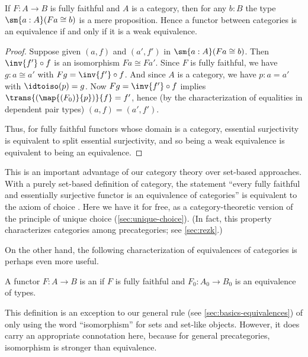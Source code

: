 \begin{lem}\label{ct:catweq}
  If $F:A\to B$ is fully faithful and $A$ is a category, then for any $b:B$ the type $\sm{a:A} (Fa\cong b)$ is a mere proposition.
  Hence a functor between categories is an equivalence if and only if it is a weak equivalence.
\end{lem}
\begin{proof}
  Suppose given $(a,f)$ and $(a',f')$ in $\sm{a:A} (Fa\cong b)$.
  Then $\inv{f'}\circ f$ is an isomorphism $Fa \cong Fa'$.
  Since $F$ is fully faithful, we have $g:a\cong a'$ with $Fg = \inv{f'}\circ f$.
  And since $A$ is a category, we have $p:a=a'$ with $\idtoiso(p)=g$.
  Now $Fg = \inv{f'}\circ f$ implies $\trans{(\map{(F_0)}{p})}{f} = f'$, hence (by the characterization of equalities in dependent pair types) $(a,f)=(a',f')$.

  Thus, for fully faithful functors whose domain is a category, essential surjectivity is equivalent to split essential surjectivity, and so being a weak equivalence is equivalent to being an equivalence.
\end{proof}

This is an important advantage of our category theory over set-based approaches.
With a purely set-based definition of category, the statement ``every fully faithful and essentially surjective functor is an equivalence of categories'' is equivalent to the axiom of choice \choice{}.
Here we have it for free, as a category-theoretic version of the principle of unique choice (\cref{sec:unique-choice}).
(In fact, this property characterizes categories among precategories; see \cref{sec:rezk}.)

On the other hand, the following characterization of equivalences of categories is perhaps even more useful.

\begin{defn}\label{ct:isocat}
  A functor $F:A\to B$ is an 
  if $F$ is fully faithful and $F_0:A_0\to B_0$ is an equivalence of types.
\end{defn}

This definition is an exception to our general rule (see \cref{sec:basics-equivalences}) of only using the word ``isomorphism'' for sets and set-like objects.
However, it does carry an appropriate connotation here, because for general precategories, isomorphism is stronger than equivalence.


